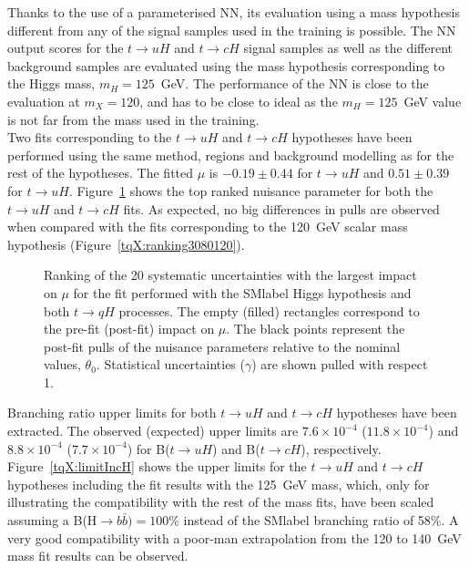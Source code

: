 Thanks to the use of a parameterised NN, its evaluation using a mass hypothesis different from any of the signal samples used in the training is possible. The NN output scores for the $t\to uH$ and $t\to cH$ signal samples as well as the different background samples are evaluated using the mass hypothesis corresponding to the Higgs mass, $m_H=125$~GeV. The performance of the NN is close to the evaluation at $m_X=120$, and has to be close to ideal as the $m_H=125$~GeV value is not far from the mass used in the training.\\

Two fits corresponding to the $t\to uH$ and $t\to cH$ hypotheses have been performed using the same method, regions and background modelling as for the rest of the hypotheses. The fitted $\mu$ is $-0.19\pm0.44$ for $t\to uH$ and $0.51\pm0.39$ for $t\to uH$. Figure~\ref{tqX:RankqH} shows the top ranked nuisance parameter for both the $t\to uH$ and $t\to cH$ fits. As expected, no big differences in pulls are observed when compared with the fits corresponding to the 120~GeV scalar mass hypothesis (Figure~\ref{tqX:ranking3080120}).\\

\begin{figure}[htb]
    \RawFloats
    \centering
    \caption{Ranking of the 20 systematic uncertainties with the largest impact on $\mu$ for the fit performed with the \acrshort{SMlabel} Higgs hypothesis and both $t\to qH$ processes. The empty (filled) rectangles correspond  to the pre-fit (post-fit) impact on $\mu$. The black points represent the post-fit pulls of the nuisance parameters relative to the nominal values, $\theta_0$. Statistical uncertainties ($\gamma$) are shown pulled with respect 1.}
    \label{tqX:RankqH}
\end{figure}

Branching ratio upper limits for both $t\to uH$ and $t\to cH$ hypotheses have been extracted. The observed (expected) upper limits are $7.6\times10^{-4}$ ($11.8\times10^{-4}$) and $8.8\times10^{-4}$ ($7.7\times10^{-4}$) for B($t\to uH$) and B($t\to cH$), respectively. Figure~\ref{tqX:limitIncH} shows the upper limits for the $t\to uH$ and $t\to cH$ hypotheses including the fit results with the 125~GeV mass, which, only for illustrating the compatibility with the rest of the mass fits, have been scaled assuming a B(H$\rightarrow b \bar{b}) = 100\%$ instead of the \acrshort{SMlabel} branching ratio of 58\%. A very good compatibility with a poor-man extrapolation from the 120 to 140~GeV mass fit results can be observed.\\

